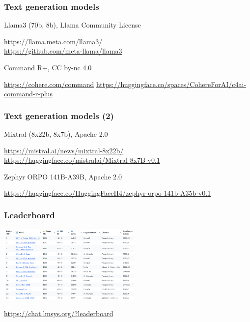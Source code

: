 \documentclass[17pt,aspectratio=169,hyperref={pdfusetitle,colorlinks,allcolors=olive}]{beamer}
\begin{document}
\begin{frame}[fragile]
\frametitle{Text generation models}

Llama3 (70b, 8b), Llama Community License
\begin{flushright}
  \url{https://llama.meta.com/llama3/} \\
  \url{https://github.com/meta-llama/llama3} \\
\end{flushright}

Command R+,  CC by-nc 4.0

\begin{flushright}
  \url{https://cohere.com/command}
  \url{https://huggingface.co/spaces/CohereForAI/c4ai-command-r-plus}
\end{flushright}

\end{frame}

\begin{frame}[fragile]
\frametitle{Text generation models (2)}

Mixtral (8x22b, 8x7b), Apache 2.0

\begin{flushright}
  \url{https://mistral.ai/news/mixtral-8x22b/}
  \url{https://huggingface.co/mistralai/Mixtral-8x7B-v0.1}
\end{flushright}


Zephyr ORPO 141B-A39B, Apache 2.0

\begin{flushright}
  \url{https://huggingface.co/HuggingFaceH4/zephyr-orpo-141b-A35b-v0.1}
\end{flushright}

\end{frame}


\begin{frame}[fragile]
\frametitle{Leaderboard}

    \includegraphics[width=7cm]{figs/leaderboard}


\url{https://chat.lmsys.org/?leaderboard}

\end{frame}
\end{document}
